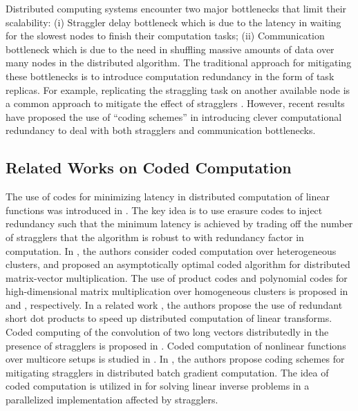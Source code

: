 \documentclass[onecolumn,journal,twoside]{IEEEtran}
\begin{document}
Distributed computing systems encounter two major bottlenecks that limit their scalability: (i) Straggler delay bottleneck which is due to the latency in waiting for the slowest nodes to finish their computation tasks; (ii) Communication bottleneck which is due to the need in shuffling massive amounts of data over many nodes in the distributed algorithm. The traditional approach for mitigating these bottlenecks is to introduce computation redundancy in the form of task replicas. For example, replicating the straggling task on another available node is a common approach to mitigate the effect of stragglers \cite{zaharia2008improving}. However, recent results have proposed the use of ``coding schemes'' in introducing clever computational redundancy to deal with both stragglers and communication bottlenecks. 

\subsection{Related Works on Coded Computation}
The use of codes for minimizing latency in distributed computation of linear functions was introduced in \cite{lee2016speeding}. The key idea is to use erasure codes to inject redundancy such that the minimum latency is achieved by trading off the number of stragglers that the algorithm is robust to with redundancy factor in computation. In \cite{reisizadeh}, the authors consider coded computation over heterogeneous clusters, and proposed an asymptotically optimal coded algorithm for distributed matrix-vector multiplication. The use of product codes and polynomial codes for high-dimensional matrix multiplication over homogeneous clusters is proposed in \cite{lee-suh} and \cite{yu2017polynomial}, respectively. In a related work \cite{dutta2016short}, the authors propose the use of redundant short dot products to speed up distributed computation of linear transforms. Coded computing of the convolution of two long vectors distributedly in the presence of stragglers is proposed in \cite{dutta2017coded}. Coded computation of nonlinear functions over multicore setups is studied in \cite{multicore}. In \cite{tandon2016gradient}, the authors propose coding schemes for mitigating stragglers in distributed batch gradient computation. The idea of coded computation is utilized in  \cite{yang2017coding} for solving linear inverse problems in a parallelized implementation affected by stragglers.  
\end{document}

